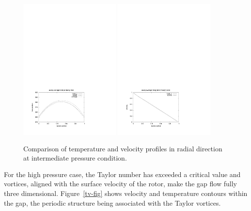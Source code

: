 \begin{figure}[htbp]
\begin{center}
\includegraphics[width=0.45\textwidth,viewport=41 46 411 298,clip=true]{../3D/taylor-couette/temperature-intermediate.pdf}
\includegraphics[width=0.45\textwidth,viewport=41 50 407 303,clip=true]{../3D/taylor-couette/velocity-intermediate.pdf}
\end{center}
\caption{Comparison of temperature and velocity profiles in radial direction at intermediate pressure condition.}
\label{tci-tv-fig}
\end{figure}

\medskip
For the high pressure case, the Taylor number has exceeded a critical value and vortices,
aligned with the surface velocity of the rotor, make the gap flow fully three dimensional.
Figure~\ref{tv-fig} shows velocity and temperature contours within the gap, 
the periodic structure being associated with the Taylor vortices.

